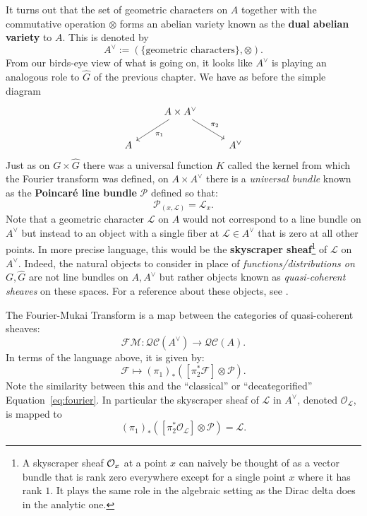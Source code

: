 It turns out that the set of geometric characters on $A$ together with the commutative operation $\otimes$ forms an abelian variety known as the \textbf{dual abelian variety} to $A$. This is denoted by
\[
	A^\vee := (\{\text{geometric characters}\}, \otimes).
\]
From our birds-eye view of what is going on, it looks like $A^\vee$ is playing an analogous role to $\hat G$ of the previous chapter. We have as before the simple diagram
\[
	\begin{tikzcd}
		& A \times A^\vee \arrow[ld,"\pi_1"] \arrow[rd,"\pi_2"]&\\
		A & & A^\vee
	\end{tikzcd}
\]
Just as on $G \times \hat G$ there was a universal function $K$ called the kernel from which the Fourier transform was defined, on $A \times A^\vee$ there is a \emph{universal bundle} known as the \textbf{Poincar\'e line bundle} $\mathcal P$ defined so that:
\[
	\mathcal P_{(x, \mathcal L)} = \mathcal L_x.
\]
Note that a geometric character $\mathcal L$ on $A$ would not correspond to a line bundle on $A^\vee$ but instead to an object with a single fiber at $\mathcal L \in A^\vee$ that is zero at all other points. In more precise language, this would be the \textbf{skyscraper sheaf}\footnote{A skyscraper sheaf $\mathcal{O}_x$ at a point $x$ can naively be thought of as a vector bundle that is rank zero everywhere except for a single point $x$ where it has rank $1$. It plays the same role in the algebraic setting as the Dirac delta does in the analytic one.} of $\mathcal L$ on $A^\vee$. Indeed, the natural objects to consider in place of \emph{functions/distributions on $G, \hat G$} are not line bundles on $A, A^\vee$ but rather objects known as \emph{quasi-coherent sheaves} on these spaces. For a reference about these objects, see \cite{hartshorne1977}.
\begin{concept}
	The Fourier-Mukai Transform is a map between the categories of quasi-coherent sheaves:
	\[
		\mathcal{FM}: \mathcal{QC}(A^\vee) \to \mathcal{QC}(A).
	\]
	In terms of the language above, it is given by:
	\[
		\mathcal F \mapsto (\pi_1)_* ([\pi_2^* \mathcal F] \otimes \mathcal P) .
	\]
	Note the similarity between this and the ``classical'' or ``decategorified'' Equation~\eqref{eq:fourier}. 
	In particular the skyscraper sheaf of $\mathcal L$ in $A^\vee$, denoted $\mathcal O_{\mathcal L}$, is mapped to 
	\[
		(\pi_1)_* ([\pi_2^* \mathcal O_{\mathcal L}] \otimes \mathcal P) = \mathcal L.
	\]
\end{concept}

